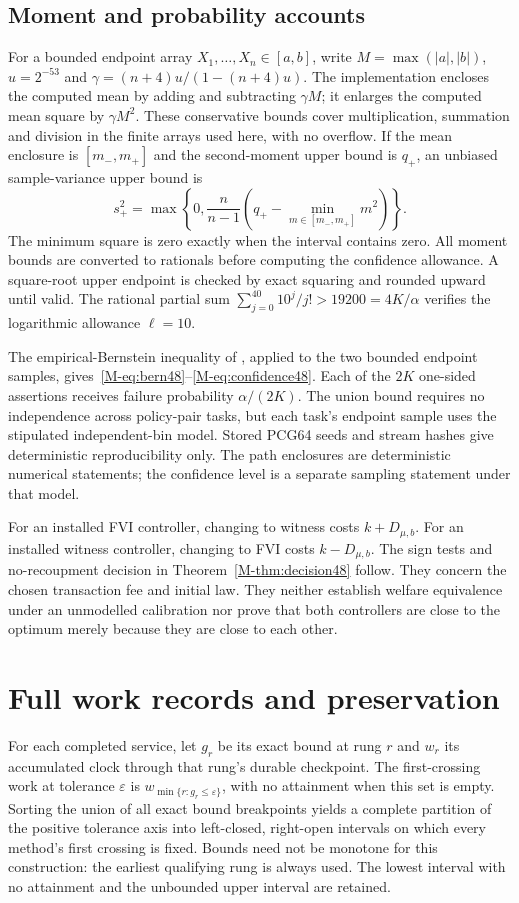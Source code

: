 \subsection{Moment and probability accounts}
For a bounded endpoint array $X_1,\ldots,X_n\in[a,b]$, write $M=\max(|a|,|b|)$, $u=2^{-53}$ and $\gamma=(n+4)u/(1-(n+4)u)$. The implementation encloses the computed mean by adding and subtracting $\gamma M$; it enlarges the computed mean square by $\gamma M^2$. These conservative bounds cover multiplication, summation and division in the finite arrays used here, with no overflow. If the mean enclosure is $[m_-,m_+]$ and the second-moment upper bound is $q_+$, an unbiased sample-variance upper bound is
\[
 s_+^2=\max\left\{0,\frac n{n-1}
 \left(q_+-\min_{m\in[m_-,m_+]}m^2\right)\right\}.
\]
The minimum square is zero exactly when the interval contains zero. All moment bounds are converted to rationals before computing the confidence allowance. A square-root upper endpoint is checked by exact squaring and rounded upward until valid. The rational partial sum $\sum_{j=0}^{40}10^j/j!>19200=4K/\alpha$ verifies the logarithmic allowance $\ell=10$.

The empirical-Bernstein inequality of \citet{maurer2009}, applied to the two bounded endpoint samples, gives~\eqref{M-eq:bern48}--\eqref{M-eq:confidence48}. Each of the $2K$ one-sided assertions receives failure probability $\alpha/(2K)$. The union bound requires no independence across policy-pair tasks, but each task's endpoint sample uses the stipulated independent-bin model. Stored PCG64 seeds and stream hashes give deterministic reproducibility only. The path enclosures are deterministic numerical statements; the confidence level is a separate sampling statement under that model.

For an installed FVI controller, changing to witness costs $k+D_{\mu,b}$. For an installed witness controller, changing to FVI costs $k-D_{\mu,b}$. The sign tests and no-recoupment decision in Theorem~\ref{M-thm:decision48} follow. They concern the chosen transaction fee and initial law. They neither establish welfare equivalence under an unmodelled calibration nor prove that both controllers are close to the optimum merely because they are close to each other.

\section{Full work records and preservation}\label{supp:work48}
For each completed service, let $g_r$ be its exact bound at rung $r$ and $w_r$ its accumulated clock through that rung's durable checkpoint. The first-crossing work at tolerance $\varepsilon$ is $w_{\min\{r:g_r\le\varepsilon\}}$, with no attainment when this set is empty. Sorting the union of all exact bound breakpoints yields a complete partition of the positive tolerance axis into left-closed, right-open intervals on which every method's first crossing is fixed. Bounds need not be monotone for this construction: the earliest qualifying rung is always used. The lowest interval with no attainment and the unbounded upper interval are retained.

